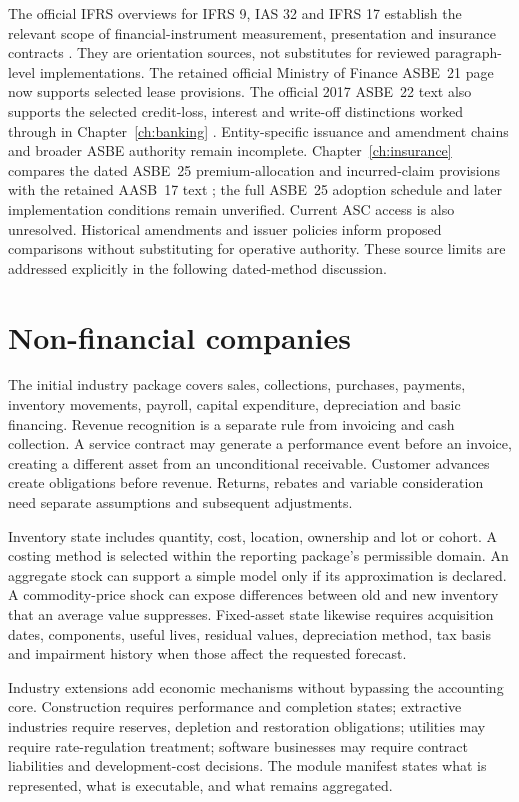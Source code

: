 The official IFRS overviews for IFRS 9, IAS 32 and IFRS 17 establish the relevant
scope of financial-instrument measurement, presentation and insurance
contracts \citep{ifrs9,ias32,ifrs17}. They are orientation sources, not substitutes
for reviewed paragraph-level implementations. The retained official Ministry of Finance ASBE~21 page now supports selected
lease provisions. The official 2017 ASBE~22 text also supports the selected
credit-loss, interest and write-off distinctions worked through in
Chapter~\ref{ch:banking} \citep{mofasbe22}. Entity-specific issuance and amendment
chains and broader ASBE authority remain incomplete. Chapter~\ref{ch:insurance}
compares the dated ASBE~25 premium-allocation and incurred-claim provisions
with the retained AASB~17 text \citep{mofasbe25}; the full ASBE~25 adoption
schedule and later implementation conditions remain unverified. Current ASC
access is also unresolved.
Historical amendments and issuer policies inform proposed comparisons without
substituting for operative authority. These source limits are addressed
explicitly in the following dated-method discussion.

\section{Non-financial companies}

The initial industry package covers sales, collections, purchases, payments,
inventory movements, payroll, capital expenditure, depreciation and basic
financing. Revenue recognition is a separate rule from invoicing and cash
collection. A service contract may generate a performance event before an
invoice, creating a different asset from an unconditional receivable. Customer
advances create obligations before revenue. Returns, rebates and variable
consideration need separate assumptions and subsequent adjustments.

Inventory state includes quantity, cost, location, ownership and lot or cohort.
A costing method is selected within the reporting package's permissible
domain. An aggregate stock can support a simple model only if its approximation
is declared. A commodity-price shock can expose differences between old and
new inventory that an average value suppresses. Fixed-asset state likewise
requires acquisition dates, components, useful lives, residual values,
depreciation method, tax basis and impairment history when those affect the
requested forecast.

Industry extensions add economic mechanisms without bypassing the accounting
core. Construction requires performance and completion states; extractive
industries require reserves, depletion and restoration obligations; utilities
may require rate-regulation treatment; software businesses may require
contract liabilities and development-cost decisions. The module manifest
states what is represented, what is executable, and what remains aggregated.

